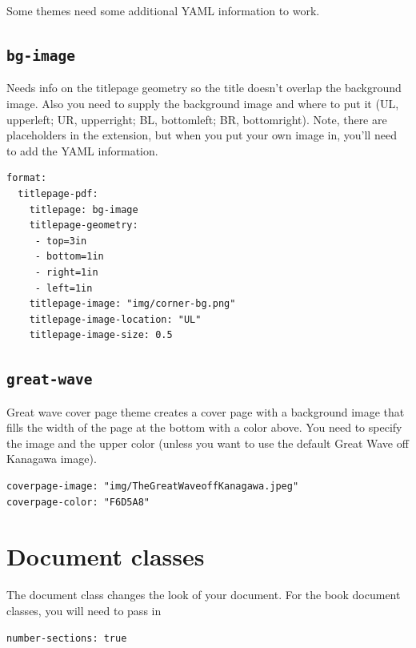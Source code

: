 \documentclass[
  oneside,
  open=any]{scrbook}
\begin{document}
Some themes need some additional YAML information to work.

\hypertarget{bg-image}{%
\subsection{\texorpdfstring{\texttt{bg-image}}{bg-image}}\label{bg-image}}

Needs info on the titlepage geometry so the title doesn't overlap the
background image. Also you need to supply the background image and where
to put it (UL, upperleft; UR, upperright; BL, bottomleft; BR,
bottomright). Note, there are placeholders in the extension, but when
you put your own image in, you'll need to add the YAML information.

\begin{verbatim}
format: 
  titlepage-pdf:
    titlepage: bg-image
    titlepage-geometry: 
     - top=3in
     - bottom=1in
     - right=1in
     - left=1in
    titlepage-image: "img/corner-bg.png"
    titlepage-image-location: "UL"
    titlepage-image-size: 0.5
\end{verbatim}

\hypertarget{great-wave}{%
\subsection{\texorpdfstring{\texttt{great-wave}}{great-wave}}\label{great-wave}}

Great wave cover page theme creates a cover page with a background image
that fills the width of the page at the bottom with a color above. You
need to specify the image and the upper color (unless you want to use
the default Great Wave off Kanagawa image).

\begin{verbatim}
coverpage-image: "img/TheGreatWaveoffKanagawa.jpeg"
coverpage-color: "F6D5A8"
\end{verbatim}

\hypertarget{document-classes}{%
\section{Document classes}\label{document-classes}}

The document class changes the look of your document. For the book
document classes, you will need to pass in

\begin{verbatim}
number-sections: true
\end{verbatim}
\end{document}
